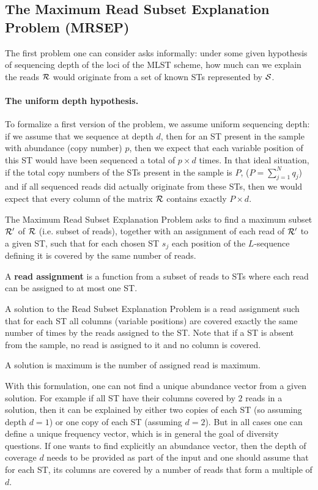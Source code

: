\documentclass[10pt]{llncs}
\begin{document}
\subsection{The Maximum Read Subset Explanation Problem (MRSEP)}
\label{ssec:MRESP}

The first problem one can consider asks informally: under some given hypothesis of sequencing depth of the loci of the MLST scheme, how much can we explain the reads $\cal R$ would originate from a set of known STs represented by $\cal S$. 

\paragraph{The uniform depth hypothesis.} To formalize a first version of the problem, we assume uniform sequencing depth: if we assume that we sequence at depth $d$, then for an ST present in the sample with abundance (copy number) $p$, then  we expect that each variable position of this ST would have been sequenced a total of $p\times d$ times. In that ideal situation, if the total copy numbers of the STs present in the sample is $P$, ($P=\sum_{j=1}^N q_j$) and if all sequenced reads did actually originate from these STs, then we would expect that every column of the matrix $\cal R$ contains exactly $P \times d$. 

The Maximum Read Subset Explanation Problem asks to find a maximum subset ${\cal R}'$ of $\cal R$ (i.e. subset of reads), together with an assignment of each read of ${\cal R}'$ to a given ST, such that for each chosen ST $s_j$ each position of the $L$-sequence defining it is covered by the same number of reads. 

A {\bf read assignment} is a function from a subset of reads to STs where each read can be assigned to at most one ST.

A solution to the Read Subset Explanation Problem is a read assignment such that for each ST all columns (variable positions) are covered exactly the same number of times by the reads assigned to the ST. Note that if a ST is absent from the sample, no read is assigned to it and no column is covered.

A solution is maximum is the number of assigned read is maximum.

\begin{remark}
    \label{rem:u_fre_vs_ab}
    With this formulation, one can not find a unique abundance vector from a given solution. For example if all ST have their columns covered by $2$ reads in a solution, then it can be explained by either two copies of each ST (so assuming depth $d=1$) or one copy of each ST (assuming $d=2$). But in all cases one can define a unique frequency vector, which is in general the goal of diversity questions. If one wants to find explicitly an abundance vector, then the depth of coverage $d$ needs to be provided as part of the input and one should assume that for each ST, its columns are covered by a number of reads that form a multiple of $d$.
\end{remark}
\end{document}
